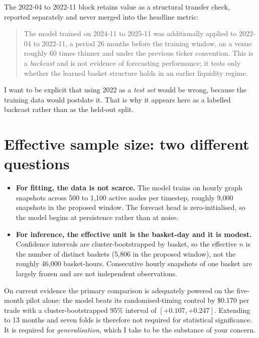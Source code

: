 \documentclass[11pt,a4paper]{article}
\begin{document}
The 2022-04 to 2022-11 block retains value as a structural transfer check,
reported separately and never merged into the headline metric:

\begin{quote}
The model trained on 2024-11 to 2025-11 was additionally applied to 2022-04 to
2022-11, a period 26 months before the training window, on a venue roughly 60
times thinner and under the previous ticker convention. This is a
\emph{backcast} and is not evidence of forecasting performance; it tests only
whether the learned basket structure holds in an earlier liquidity regime.
\end{quote}

I want to be explicit that using 2022 as a \emph{test set} would be wrong,
because the training data would postdate it. That is why it appears here as a
labelled backcast rather than as the held-out split.

\section{Effective sample size: two different questions}

\begin{itemize}
  \item \textbf{For fitting, the data is not scarce.} The model trains on
        hourly graph snapshots across 500 to 1,100 active nodes per timestep,
        roughly 9,000 snapshots in the proposed window. The forecast head is
        zero-initialised, so the model begins at persistence rather than at
        noise.
  \item \textbf{For inference, the effective unit is the basket-day and it is
        modest.} Confidence intervals are cluster-bootstrapped by basket, so
        the effective $n$ is the number of distinct baskets (5,806 in the
        proposed window), not the roughly 46,000 basket-hours. Consecutive
        hourly snapshots of one basket are largely frozen and are not
        independent observations.
\end{itemize}

On current evidence the primary comparison is adequately powered on the
five-month pilot alone: the model beats its randomised-timing control by
\$0.170 per trade with a cluster-bootstrapped 95\% interval of
$[+0.107, +0.247]$. Extending to 13 months and seven folds is therefore not
required for statistical significance. It is required for
\emph{generalisation}, which I take to be the substance of your concern.
\end{document}

